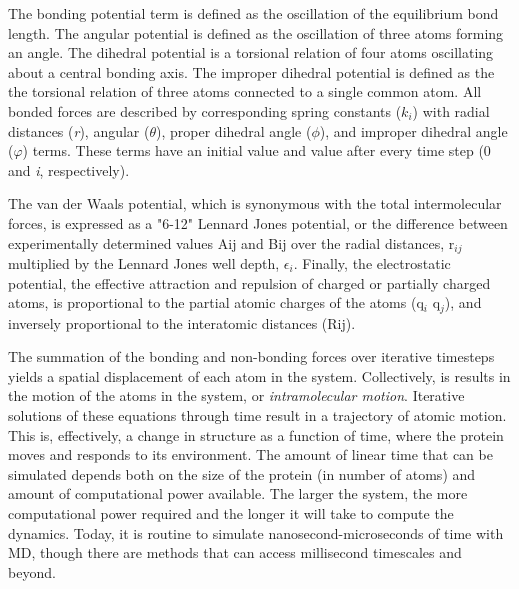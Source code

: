 \documentclass[12pt]{ucsddissertation}
\begin{document}
\begin{dissertationintroduction}
The bonding potential term is defined as the oscillation of the equilibrium bond length. The angular potential is defined as the oscillation of three atoms forming an angle. The dihedral potential is a torsional relation of four atoms oscillating about a central bonding axis. The improper dihedral potential is defined as the the torsional relation of three atoms connected to a single common atom. All bonded forces are described by corresponding spring constants (${k}_{i}$) with radial distances (\textit{r}), angular ($\theta$), proper dihedral angle ($\phi$), and improper dihedral angle ($\varphi$)  terms. These terms have an initial value and value after every time step (0 and \textit{i}, respectively). 

The van der Waals potential, which is synonymous with the total intermolecular forces, is expressed as a "6-12" Lennard Jones potential, or the difference between experimentally determined values Aij and Bij over the radial distances, r$_{ij}$ multiplied by the Lennard Jones well depth, $\epsilon_{i}$. Finally, the electrostatic potential, the effective attraction and repulsion of charged or partially charged atoms, is proportional to the partial atomic charges of the atoms (q$_{i}$ q$_{j}$), and inversely proportional to the interatomic distances (Rij). 

The summation of the bonding and non-bonding forces over iterative timesteps yields a spatial displacement of each atom in the system. Collectively, is results in the motion of the atoms in the system, or \textit{intramolecular motion}. Iterative solutions of these equations through time result in a trajectory of atomic motion. This is, effectively, a change in structure as a function of time, where the protein moves and responds to its environment. The amount of linear time that can be simulated depends both on the size of the protein (in number of atoms) and amount of computational power available. The larger the system, the more computational power required and the longer it will take to compute the dynamics. Today, it is routine to simulate nanosecond-microseconds of time with MD, though there are methods that can access millisecond timescales and beyond\cite{Shaw2009,Pierce2012}. 


\end{dissertationintroduction}
\end{document}
